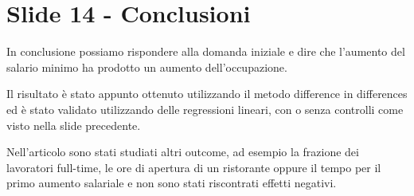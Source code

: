 \documentclass{article}
\begin{document}
\section{Slide 14 - Conclusioni}

In conclusione possiamo rispondere alla domanda iniziale e dire che l'aumento del salario minimo ha prodotto un aumento dell'occupazione.

Il risultato è stato appunto ottenuto utilizzando il metodo difference in differences ed è stato validato utilizzando delle regressioni lineari, con o senza controlli come visto nella slide precedente.


Nell'articolo sono stati studiati altri outcome, ad esempio la frazione dei lavoratori full-time,  le ore di apertura di un ristorante oppure il tempo per il primo aumento salariale e non sono stati riscontrati effetti negativi.
\end{document}

